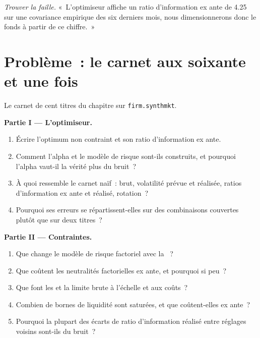\begin{exercise}[$\star\star\star$]\label{exo:rs:portfolio-construction-i:8}
\emph{Trouver la faille.} «~L'optimiseur affiche un ratio d'information ex ante de 4.25 sur une covariance empirique des six derniers mois, nous dimensionnerons donc le fonds à partir de ce chiffre.~»
\end{exercise}

\section{Problème~: le carnet aux soixante et une fois}

\begin{problem}\label{pb:rs:portfolio-construction-i:1}
Le carnet de cent titres du chapitre sur \texttt{firm.synthmkt}.

\medskip\noindent\textbf{Partie I --- L'optimiseur.}
\begin{enumerate}
\item Écrire l'optimum non contraint et son ratio d'information ex ante.
\item Comment l'alpha et le modèle de risque sont-ils construits, et pourquoi l'alpha vaut-il la vérité plus du bruit~?
\item À quoi ressemble le carnet naïf~: brut, volatilité prévue et réalisée, ratios d'information ex ante et réalisé, rotation~?
\item Pourquoi ses erreurs se répartissent-elles sur des combinaisons couvertes plutôt que sur deux titres~?
\end{enumerate}

\medskip\noindent\textbf{Partie II --- Contraintes.}
\begin{enumerate}[resume]
\item Que change le modèle de risque factoriel avec la ~?
\item Que coûtent les neutralités factorielles ex ante, et pourquoi si peu~?
\item Que font les  et la limite brute à l'échelle et aux coûts~?
\item Combien de bornes de liquidité sont saturées, et que coûtent-elles ex ante~?
\item Pourquoi la plupart des écarts de ratio d'information réalisé entre réglages voisins sont-ils du bruit~?
\end{enumerate}


\end{problem}
